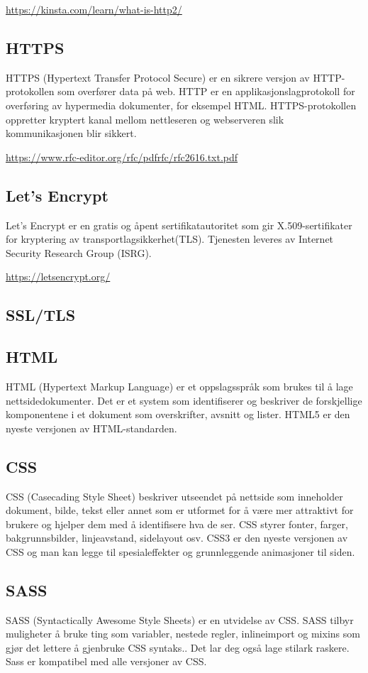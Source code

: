 \url{https://kinsta.com/learn/what-is-http2/}

\subsection{HTTPS}
HTTPS (Hypertext Transfer Protocol Secure) er en sikrere versjon av HTTP-protokollen som overfører data på web. HTTP er en applikasjonslagprotokoll for overføring av hypermedia dokumenter, for eksempel HTML. HTTPS-protokollen oppretter kryptert kanal mellom nettleseren og webserveren slik  kommunikasjonen blir sikkert. 

\url{https://www.rfc-editor.org/rfc/pdfrfc/rfc2616.txt.pdf}

\subsection{Let’s Encrypt}
Let’s Encrypt er en gratis og åpent sertifikatautoritet som gir X.509-sertifikater for kryptering av transportlagsikkerhet(TLS). Tjenesten leveres av Internet Security Research Group (ISRG).

\url{https://letsencrypt.org/}

\subsection{SSL/TLS}

\subsection{HTML}
HTML (Hypertext Markup Language) er et oppslagsspråk som brukes til å lage nettsidedokumenter. Det er et system som identifiserer og beskriver de forskjellige komponentene i et dokument som overskrifter, avsnitt og lister. HTML5 er den nyeste versjonen av HTML-standarden.

\subsection{CSS}
CSS (Casecading Style Sheet) beskriver utseendet på nettside som inneholder dokument, bilde, tekst eller annet som er utformet for å være mer attraktivt for brukere og hjelper dem med å identifisere hva de ser. CSS styrer fonter, farger, bakgrunnsbilder, linjeavstand, sidelayout osv. CSS3 er den nyeste versjonen av CSS og man kan legge til spesialeffekter og grunnleggende animasjoner til siden.

\subsection{SASS}
SASS (Syntactically Awesome Style Sheets) er en utvidelse av CSS. SASS tilbyr muligheter å bruke ting som variabler, nestede regler, inlineimport og mixins som gjør det lettere å gjenbruke CSS syntaks.. Det lar deg også lage stilark raskere. Sass er kompatibel med alle versjoner av CSS.  

